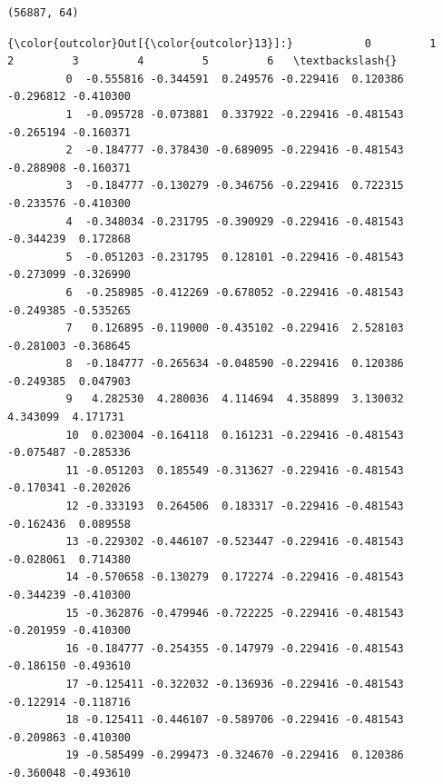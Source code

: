 \documentclass[11pt]{article}
\begin{document}
    \begin{Verbatim}[commandchars=\\\{\}]
(56887, 64)

    \end{Verbatim}

\begin{Verbatim}[commandchars=\\\{\}]
{\color{outcolor}Out[{\color{outcolor}13}]:}           0         1         2         3         4         5         6   \textbackslash{}
         0  -0.555816 -0.344591  0.249576 -0.229416  0.120386 -0.296812 -0.410300   
         1  -0.095728 -0.073881  0.337922 -0.229416 -0.481543 -0.265194 -0.160371   
         2  -0.184777 -0.378430 -0.689095 -0.229416 -0.481543 -0.288908 -0.160371   
         3  -0.184777 -0.130279 -0.346756 -0.229416  0.722315 -0.233576 -0.410300   
         4  -0.348034 -0.231795 -0.390929 -0.229416 -0.481543 -0.344239  0.172868   
         5  -0.051203 -0.231795  0.128101 -0.229416 -0.481543 -0.273099 -0.326990   
         6  -0.258985 -0.412269 -0.678052 -0.229416 -0.481543 -0.249385 -0.535265   
         7   0.126895 -0.119000 -0.435102 -0.229416  2.528103 -0.281003 -0.368645   
         8  -0.184777 -0.265634 -0.048590 -0.229416  0.120386 -0.249385  0.047903   
         9   4.282530  4.280036  4.114694  4.358899  3.130032  4.343099  4.171731   
         10  0.023004 -0.164118  0.161231 -0.229416 -0.481543 -0.075487 -0.285336   
         11 -0.051203  0.185549 -0.313627 -0.229416 -0.481543 -0.170341 -0.202026   
         12 -0.333193  0.264506  0.183317 -0.229416 -0.481543 -0.162436  0.089558   
         13 -0.229302 -0.446107 -0.523447 -0.229416 -0.481543 -0.028061  0.714380   
         14 -0.570658 -0.130279  0.172274 -0.229416 -0.481543 -0.344239 -0.410300   
         15 -0.362876 -0.479946 -0.722225 -0.229416 -0.481543 -0.201959 -0.410300   
         16 -0.184777 -0.254355 -0.147979 -0.229416 -0.481543 -0.186150 -0.493610   
         17 -0.125411 -0.322032 -0.136936 -0.229416 -0.481543 -0.122914 -0.118716   
         18 -0.125411 -0.446107 -0.589706 -0.229416 -0.481543 -0.209863 -0.410300   
         19 -0.585499 -0.299473 -0.324670 -0.229416  0.120386 -0.360048 -0.493610   
         

\end{Verbatim}
\end{document}

